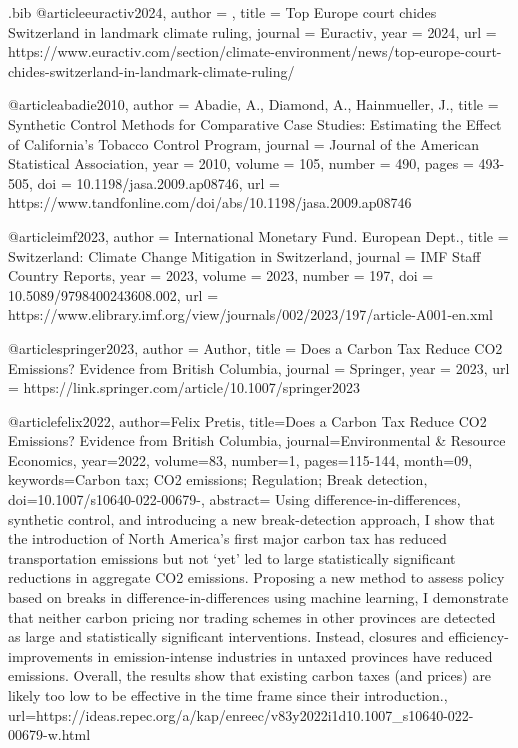 \begin{filecontents}{.bib}
@article{euractiv2024,
  author = {},
  title = {Top Europe court chides Switzerland in landmark climate ruling},
  journal = {Euractiv},
  year = {2024},
  url = {https://www.euractiv.com/section/climate-environment/news/top-europe-court-chides-switzerland-in-landmark-climate-ruling/}
}

@article{abadie2010,
  author = {Abadie, A., Diamond, A., Hainmueller, J.},
  title = {Synthetic Control Methods for Comparative Case Studies: Estimating the Effect of California’s Tobacco Control Program},
  journal = {Journal of the American Statistical Association},
  year = {2010},
  volume = {105},
  number = {490},
  pages = {493-505},
  doi = {10.1198/jasa.2009.ap08746},
  url = {https://www.tandfonline.com/doi/abs/10.1198/jasa.2009.ap08746}
}

@article{imf2023,
  author = {International Monetary Fund. European Dept.},
  title = {Switzerland: Climate Change Mitigation in Switzerland},
  journal = {IMF Staff Country Reports},
  year = {2023},
  volume = {2023},
  number = {197},
  doi = {10.5089/9798400243608.002},
  url = {https://www.elibrary.imf.org/view/journals/002/2023/197/article-A001-en.xml}
}

@article{springer2023,
  author = {Author},
  title = {Does a Carbon Tax Reduce CO2 Emissions? Evidence from British Columbia},
  journal = {Springer},
  year = {2023},
  url = {https://link.springer.com/article/10.1007/springer2023}
}


@article{felix2022,
  author={Felix Pretis},
  title={{Does a Carbon Tax Reduce CO2 Emissions? Evidence from British Columbia}},
  journal={Environmental \& Resource Economics},
  year=2022,
  volume={83},
  number={1},
  pages={115-144},
  month={09},
  keywords={Carbon tax; CO2 emissions; Regulation; Break detection},
  doi={10.1007/s10640-022-00679-},
  abstract={ Using difference-in-differences, synthetic control, and introducing a new break-detection approach, I show that the introduction of North America’s first major carbon tax has reduced transportation emissions but not ‘yet’ led to large statistically significant reductions in aggregate CO2 emissions. Proposing a new method to assess policy based on breaks in difference-in-differences using machine learning, I demonstrate that neither carbon pricing nor trading schemes in other provinces are detected as large and statistically significant interventions. Instead, closures and efficiency-improvements in emission-intense industries in untaxed provinces have reduced emissions. Overall, the results show that existing carbon taxes (and prices) are likely too low to be effective in the time frame since their introduction.},
  url={https://ideas.repec.org/a/kap/enreec/v83y2022i1d10.1007_s10640-022-00679-w.html}
}


\end{filecontents}
